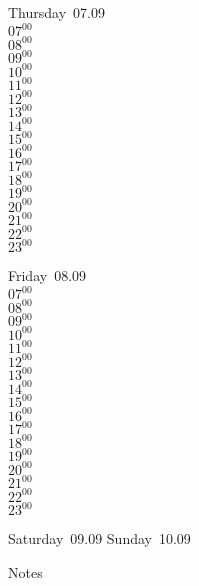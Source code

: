 \documentclass[11pt, a4paper]{book}\usepackage[]{graphicx}\usepackage[]{color}
\begin{document}
\begin{weekdaybox}
  Thursday~07.09\\
  { 
  \vfill
  $07^{00}$\\
$08^{00}$\\
$09^{00}$\\
$10^{00}$\\
$11^{00}$\\
$12^{00}$\\
$13^{00}$\\
$14^{00}$\\
$15^{00}$\\
$16^{00}$\\
$17^{00}$\\
$18^{00}$\\
$19^{00}$\\
$20^{00}$\\
$21^{00}$\\
$22^{00}$\\
$23^{00}$\\
  }
\end{weekdaybox} 
\begin{weekdaybox}
  Friday~08.09\\
  { 
  \vfill
  $07^{00}$\\
$08^{00}$\\
$09^{00}$\\
$10^{00}$\\
$11^{00}$\\
$12^{00}$\\
$13^{00}$\\
$14^{00}$\\
$15^{00}$\\
$16^{00}$\\
$17^{00}$\\
$18^{00}$\\
$19^{00}$\\
$20^{00}$\\
$21^{00}$\\
$22^{00}$\\
$23^{00}$\\
  }
\end{weekdaybox}
\begin{weekendbox}
  Saturday~09.09
  \tcblower
  Sunday~10.09
\end{weekendbox} %
\begin{notebox}
  Notes
\end{notebox}
\clearpage
\end{document}
